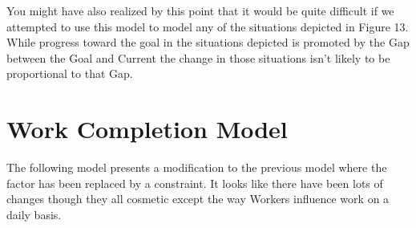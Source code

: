 \documentclass[]{memoir}
\begin{document}
You might have also realized by this point that it would be quite
difficult if we attempted to use this model to model any of the
situations depicted in Figure 13. While progress toward the goal in the
situations depicted is promoted by the Gap between the Goal and Current
the change in those situations isn't likely to be proportional to that
Gap.

\section{Work Completion Model}

The following model presents a modification to the previous model where
the factor has been replaced by a constraint. It looks like there have
been lots of changes though they all cosmetic except the way Workers
influence work on a daily basis.

\FloatBarrier 
\end{document}
